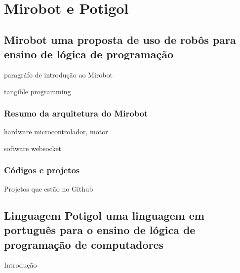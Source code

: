 \chapter{Mirobot e Potigol}
\label{cap:referencial}

\section{Mirobot uma proposta de uso de robôs para ensino de lógica de programação}
\label{sec:mirobot}

paragráfo de introdução ao Mirobot

tangible programming

\subsection{Resumo da arquitetura do Mirobot}

hardware microcontrolador, motor

software websocket

\subsection{Códigos e projetos}

Projetos que estão no Github


\section{Linguagem Potigol uma linguagem em português para o ensino de lógica de programação de computadores}
\label{sec:potigol}

Introdução
